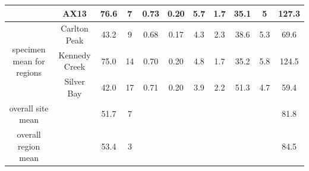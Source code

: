 \documentclass[9pt,twoside,lineno]{pnas-new}
\begin{document}
\begin{table}[]
\begin{tabular}{ccccccccccc}
                                           & AX13          & 76.6     & 7  & 0.73 & 0.20     & 5.7            & 1.7            & 35.1       & 5        & 127.3        \\ 
                                           \hline
\multirow{3}{*}{specimen mean for regions} & Carlton Peak  & 43.2     & 9  & 0.68 & 0.17    & 4.3          & 2.3            & 38.6       & 5.3     & 69.6         \\
                                           & Kennedy Creek & 75.0     & 14 & 0.70  & 0.20     & 4.8           & 1.7            & 35.2      & 5.8     & 124.5        \\
                                           & Silver Bay    & 42.0     & 17 & 0.71 & 0.20     & 3.9           & 2.2            & 51.3      & 4.7     & 59.4         \\
\hline
overall site mean                          &               & 51.7     & 7  &      &         &                &                 &            &          & 81.8         \\
overall region mean                        &               & 53.4     & 3  &      &         &                &                 &            &          & 84.5         
\end{tabular}
\end{table}



\clearpage


\FloatBarrier


\end{document}
